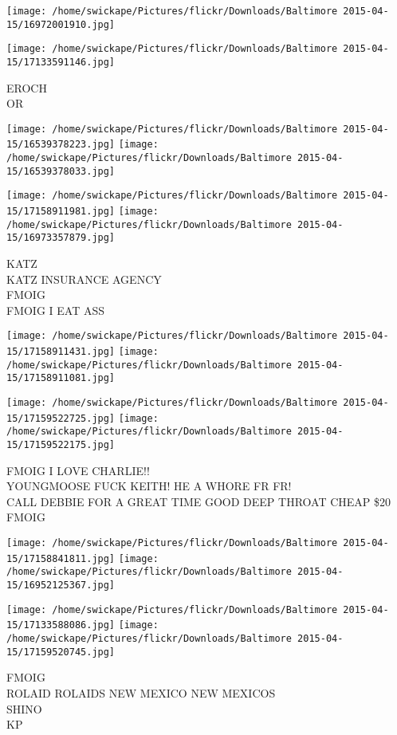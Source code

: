 \documentclass[10pt,letterpaper]{article}
\begin{document}
\texttt{[image: /home/swickape/Pictures/flickr/Downloads/Baltimore 2015-04-15/16972001910.jpg]}

\vspace{0.25in}
\texttt{[image: /home/swickape/Pictures/flickr/Downloads/Baltimore 2015-04-15/17133591146.jpg]}

EROCH\\
OR
\pagebreak

\texttt{[image: /home/swickape/Pictures/flickr/Downloads/Baltimore 2015-04-15/16539378223.jpg]}
\texttt{[image: /home/swickape/Pictures/flickr/Downloads/Baltimore 2015-04-15/16539378033.jpg]}

\texttt{[image: /home/swickape/Pictures/flickr/Downloads/Baltimore 2015-04-15/17158911981.jpg]}
\texttt{[image: /home/swickape/Pictures/flickr/Downloads/Baltimore 2015-04-15/16973357879.jpg]}

KATZ\\
KATZ INSURANCE AGENCY\\
FMOIG\\
FMOIG I EAT ASS
\pagebreak

\texttt{[image: /home/swickape/Pictures/flickr/Downloads/Baltimore 2015-04-15/17158911431.jpg]}
\texttt{[image: /home/swickape/Pictures/flickr/Downloads/Baltimore 2015-04-15/17158911081.jpg]}

\texttt{[image: /home/swickape/Pictures/flickr/Downloads/Baltimore 2015-04-15/17159522725.jpg]}
\texttt{[image: /home/swickape/Pictures/flickr/Downloads/Baltimore 2015-04-15/17159522175.jpg]}

FMOIG I LOVE CHARLIE!!\\
YOUNGMOOSE FUCK KEITH! HE A WHORE FR FR!\\
CALL DEBBIE FOR A GREAT TIME GOOD DEEP THROAT CHEAP \$20\\
FMOIG
\pagebreak

\texttt{[image: /home/swickape/Pictures/flickr/Downloads/Baltimore 2015-04-15/17158841811.jpg]}
\texttt{[image: /home/swickape/Pictures/flickr/Downloads/Baltimore 2015-04-15/16952125367.jpg]}

\texttt{[image: /home/swickape/Pictures/flickr/Downloads/Baltimore 2015-04-15/17133588086.jpg]}
\texttt{[image: /home/swickape/Pictures/flickr/Downloads/Baltimore 2015-04-15/17159520745.jpg]}

FMOIG\\
ROLAID ROLAIDS NEW MEXICO NEW MEXICOS\\
SHINO\\
KP
\pagebreak
\end{document}

